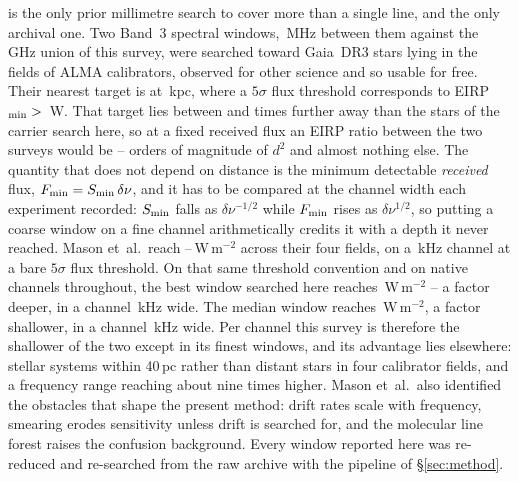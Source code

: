 \citet{Mason2025} is the only prior millimetre search to cover more than a
single line, and the only archival one. Two Band~3 spectral windows, \MasonBandMHz\,MHz between them against the
\CvUnionA\,GHz union of this survey, were searched toward
\MasonNStar{} Gaia~DR3 stars lying in the fields of \MasonNCal{} ALMA
calibrators, observed for other science and so usable for free. Their
nearest target is at \MasonNearKpc\,kpc, where a $5\sigma$ flux threshold
corresponds to EIRP$_{\rm min}>{}$\MasonNearEirp\,W. That target lies
between \MasonDistRatioFar{} and \MasonDistRatioNear{} times further away
than the stars of the carrier search here, so at a fixed received flux an
EIRP ratio between the two surveys would be
\MasonEirpOrdLo--\MasonEirpOrdHi{} orders of magnitude of $d^{2}$ and
almost nothing else. The quantity
that does not depend on distance is the minimum detectable \emph{received}
flux, $F_{\rm min}=S_{\rm min}\,\delta\nu$, and it has to be compared at
the channel width each experiment recorded: $S_{\rm min}$ falls as
$\delta\nu^{-1/2}$ while $F_{\rm min}$ rises as $\delta\nu^{1/2}$, so
putting a coarse window on a fine channel arithmetically credits it with a
depth it never reached. Mason
et~al.\ reach \MasonFluxLo--\MasonFluxHi\,W\,m$^{-2}$ across their four
fields, on a \MasonChanKHz\,kHz channel at a bare $5\sigma$ flux
threshold. On that same threshold convention and on native channels throughout, the
best window searched here reaches \FluxTrigBest\,W\,m$^{-2}$ -- a factor
\FluxNatBestRatio{} deeper, in a channel \FluxChanBestKHz\,kHz wide. The
median window reaches \FluxTrigMed\,W\,m$^{-2}$, a factor
\FluxNatMedRatio{} shallower, in a channel \FluxChanMedKHz\,kHz wide. Per channel this survey is therefore the
shallower of the two except in its finest windows, and its advantage lies
elsewhere: \NSysClassA{} stellar systems within 40\,pc rather than distant
stars in four calibrator fields, and a frequency range reaching about nine
times higher. Mason et~al.\ also
identified the obstacles that shape the present method: drift rates scale
with frequency, smearing erodes sensitivity unless drift is searched for,
and the molecular line forest raises the confusion background. Every
window reported here was re-reduced and re-searched from the raw archive
with the pipeline of \S\ref{sec:method}.

